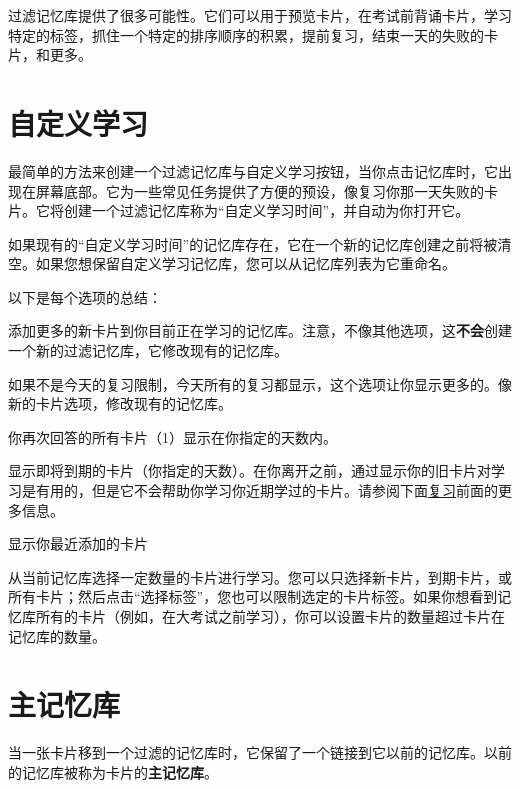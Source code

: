 \documentclass[a4paper]{book}
\begin{document}
		过滤记忆库提供了很多可能性。它们可以用于预览卡片，在考试前背诵卡片，学习特定的标签，抓住一个特定的排序顺序的积累，提前复习，结束一天的失败的卡片，和更多。
		
		\section{自定义学习}
		
		最简单的方法来创建一个过滤记忆库与自定义学习按钮，当你点击记忆库时，它出现在屏幕底部。它为一些常见任务提供了方便的预设，像复习你那一天失败的卡片。它将创建一个过滤记忆库称为“自定义学习时间”，并自动为你打开它。
		
		如果现有的“自定义学习时间”的记忆库存在，它在一个新的记忆库创建之前将被清空。如果您想保留自定义学习记忆库，您可以从记忆库列表为它重命名。
		
		以下是每个选项的总结：
		
		\begin{description}
			\itemsep1pt\parskip0pt
			\item[增加今天的新卡片限制] 添加更多的新卡片到你目前正在学习的记忆库。注意，不像其他选项，这\textbf{不会}创建一个新的过滤记忆库，它修改现有的记忆库。
			\item[增加今天的复习卡片限制] 如果不是今天的复习限制，今天所有的复习都显示，这个选项让你显示更多的。像新的卡片选项，修改现有的记忆库。
			\item[复习忘记的卡片] 你再次回答的所有卡片（1）显示在你指定的天数内。
			\item[复习前面] 显示即将到期的卡片（你指定的天数）。在你离开之前，通过显示你的旧卡片对学习是有用的，但是它不会帮助你学习你近期学过的卡片。请参阅下面\hyperref[reviewingahead]{复习}前面的更多信息。
			\item[预览新卡片] 显示你最近添加的卡片
			\item[卡片状态或标签的学习] 从当前记忆库选择一定数量的卡片进行学习。您可以只选择新卡片，到期卡片，或所有卡片；然后点击“选择标签”，您也可以限制选定的卡片标签。如果你想看到记忆库所有的卡片（例如，在大考试之前学习），你可以设置卡片的数量超过卡片在记忆库的数量。               
		\end{description}
		
		\section{主记忆库}
		
		当一张卡片移到一个过滤的记忆库时，它保留了一个链接到它以前的记忆库。以前的记忆库被称为卡片的\textbf{主记忆库}。
		
\end{document}
